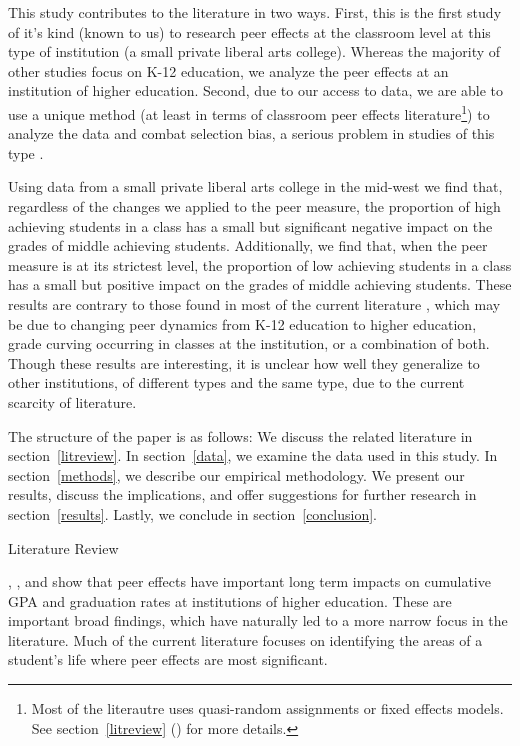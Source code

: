 \documentclass[12pt,a4paper,english,fleqn]{article}
\makeatletter
\newcommand{\sectlabel}[1]{section~\ref{#1} (\nameref{#1})}
\renewcommand\section{\@startsection{section}{1}{\z@}
{-5ex \@plus -1ex \@minus -.2ex}{2.3ex \@plus.2ex}{\normalfont\large\bf}}
\makeatother
\begin{document}
This study contributes to the literature in two ways.
First, this is the first study of it's kind (known to us) to research peer effects at the classroom level at this type of institution (a small private liberal arts college).
Whereas the majority of other studies focus on K-12 education, we analyze the peer effects at an institution of higher education.
Second, due to our access to data, we are able to use a unique method (at least in terms of classroom peer effects literature\footnote{Most of the literautre uses quasi-random assignments or fixed effects models. See \sectlabel{litreview} for more details.}) to analyze the data and combat selection bias, a serious problem in studies of this type \citep{carman2012classroom,burke2013classroom,ding2007peers}. 

Using data from a small private liberal arts college in the mid-west we find that, regardless of the changes we applied to the peer measure, the proportion of high achieving students in a class has a small but significant negative impact on the grades of middle achieving students. 
Additionally, we find that, when the peer measure is at its strictest level, the proportion of low achieving students in a class has a small but positive impact on the grades of middle achieving students. 
These results are contrary to those found in most of the current literature \citep{kang2007classroom,carman2012classroom,burke2013classroom,schlosser2008inside,lavy2012good}, which may be due to changing peer dynamics from K-12 education to higher education, grade curving occurring in classes at the institution, or a combination of both.
Though these results are interesting, it is unclear how well they generalize to other institutions, of different types and the same type, due to the current scarcity of literature. 

The structure of the paper is as follows: 
We discuss the related literature in section~\ref{litreview}. 
In section~\ref{data}, we examine the data used in this study. 
In section~\ref{methods}, we describe our empirical methodology.
We present our results, discuss the implications, and offer suggestions for further research in section~\ref{results}.
Lastly, we conclude in section~\ref{conclusion}.

\section{Literature Review}\label{litreview}

\citet{smith2015new}, \citet{luppino2015college}, and \citet{ost2010role} show that peer effects have important long term impacts on cumulative GPA and graduation rates at institutions of higher education.
These are important broad findings, which have naturally led to a more narrow focus in the literature.
Much of the current literature focuses on identifying the areas of a student's life where peer effects are most significant. 
\end{document}
